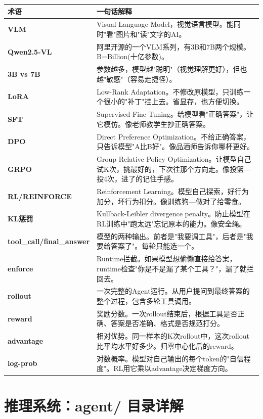 \documentclass[fontset=none,11pt,a4paper]{ctexart}
\begin{document}
\begin{longtable}{lp{9cm}}
\toprule
术语 & 一句话解释 \\
\midrule
\textbf{VLM} & Visual Language Model，视觉语言模型。能同时"看"图片和"读"文字的AI。 \\
\textbf{Qwen2.5-VL} & 阿里开源的一个VLM系列，有3B和7B两个规模。B=Billion(十亿参数)。 \\
\textbf{3B vs 7B} & 参数越多，模型越"聪明"（视觉理解更好），但也越"敏感"（容易走捷径）。 \\
\textbf{LoRA} & Low-Rank Adaptation。不修改原模型，只训练一个很小的"补丁"挂上去。省显存，也方便切换。 \\
\textbf{SFT} & Supervised Fine-Tuning。给模型看"正确答案"，让它模仿。像老师教学生抄正确答案。 \\
\textbf{DPO} & Direct Preference Optimization。不给正确答案，只告诉模型"A比B好"。像品酒师告诉你哪杯更好。 \\
\textbf{GRPO} & Group Relative Policy Optimization。让模型自己试K次，挑最好的，下次往那个方向走。像投篮---投4次，进了的记住手感。 \\
\textbf{RL/REINFORCE} & Reinforcement Learning。模型自己探索，好行为加分，坏行为扣分。像训练狗---做对了给零食。 \\
\textbf{KL惩罚} & Kullback-Leibler divergence penalty。防止模型在RL训练中"跑太远"忘记原本的能力。像安全绳。 \\
\textbf{tool\_call/final\_answer} & 模型的两种输出。前者是"我要调工具"，后者是"我要给答案了"。每轮只能选一个。 \\
\textbf{enforce} & Runtime拦截。如果模型想偷懒直接给答案，runtime检查"你是不是漏了某个工具？"，漏了就拦回去。 \\
\textbf{rollout} & 一次完整的Agent运行。从用户提问到最终答案的整个过程，包含多轮工具调用。 \\
\textbf{reward} & 奖励分数。一次rollout结束后，根据工具是否正确、答案是否准确、格式是否规范打分。 \\
\textbf{advantage} & 相对优势。同一样本的K次rollout中，这次rollout比平均水平好多少。归零中心化后的reward。 \\
\textbf{log-prob} & 对数概率。模型对自己输出的每个token的"自信程度"。RL用它乘以advantage决定梯度方向。 \\
\bottomrule
\end{longtable}

\section{推理系统：agent/ 目录详解}
\end{document}
